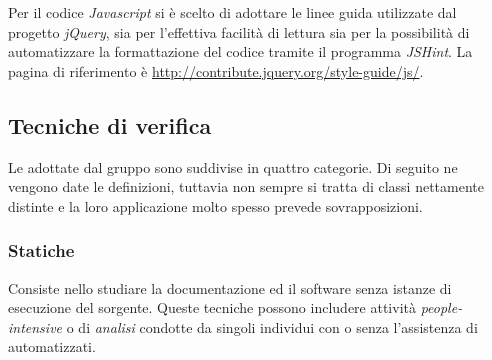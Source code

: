Per il codice \emph{Javascript} si è scelto di adottare le linee guida utilizzate dal progetto \emph{jQuery}, sia per l'effettiva facilità di lettura sia per la possibilità di automatizzare la formattazione del codice tramite il programma \emph{JSHint}. La pagina di riferimento è \url{http://contribute.jquery.org/style-guide/js/}.



\subsection{Tecniche di verifica}
	Le  adottate dal gruppo sono suddivise in quattro categorie. Di seguito ne vengono date le definizioni, tuttavia non sempre si tratta di classi nettamente distinte e la loro applicazione molto spesso prevede sovrapposizioni.
	
		\subsubsection{Statiche}

		Consiste nello studiare la documentazione ed il software senza istanze di esecuzione del sorgente. Queste tecniche possono includere attività \emph{people-intensive} o di \emph{analisi} condotte da singoli individui con o senza l'assistenza di  automatizzati.


